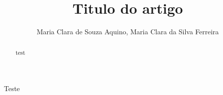 \documentclass[12pt]{article}
\title{Titulo do artigo}
\author{
    Maria Clara de Souza Aquino\inst{1},
    Maria Clara da Silva Ferreira\inst{1}\\
}
\begin{document}
    \maketitle
    \begin{abstract}
    test
    \end{abstract}


    \begin{resumo}
    Teste
    \end{resumo}

    

    
\end{document}
